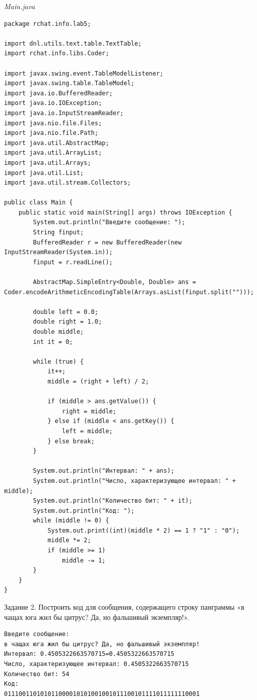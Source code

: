 \documentclass[a4paper,14pt]{extarticle}
\begin{document}
\textit{Main.java}
\begin{verbatim}
package rchat.info.lab5;

import dnl.utils.text.table.TextTable;
import rchat.info.libs.Coder;

import javax.swing.event.TableModelListener;
import javax.swing.table.TableModel;
import java.io.BufferedReader;
import java.io.IOException;
import java.io.InputStreamReader;
import java.nio.file.Files;
import java.nio.file.Path;
import java.util.AbstractMap;
import java.util.ArrayList;
import java.util.Arrays;
import java.util.List;
import java.util.stream.Collectors;

public class Main {
    public static void main(String[] args) throws IOException {
        System.out.println("Введите сообщение: ");
        String finput;
        BufferedReader r = new BufferedReader(new InputStreamReader(System.in));
        finput = r.readLine();

        AbstractMap.SimpleEntry<Double, Double> ans = Coder.encodeArithmeticEncodingTable(Arrays.asList(finput.split("")));

        double left = 0.0;
        double right = 1.0;
        double middle;
        int it = 0;

        while (true) {
            it++;
            middle = (right + left) / 2;

            if (middle > ans.getValue()) {
                right = middle;
            } else if (middle < ans.getKey()) {
                left = middle;
            } else break;
        }

        System.out.println("Интервал: " + ans);
        System.out.println("Число, характеризующее интервал: " + middle);
        System.out.println("Количество бит: " + it);
        System.out.println("Код: ");
        while (middle != 0) {
            System.out.print((int)(middle * 2) == 1 ? "1" : "0");
            middle *= 2;
            if (middle >= 1)
                middle -= 1;
        }
    }
}
\end{verbatim}

Задание 2. Построить код для сообщения, содержащего строку панграммы
«в чащах юга жил бы цитрус? Да, но фальшивый экземпляр!».

\begin{verbatim}
Введите сообщение: 
в чащах юга жил бы цитрус? Да, но фальшивый экземпляр!
Интервал: 0.4505322663570715=0.4505322663570715
Число, характеризующее интервал: 0.4505322663570715
Количество бит: 54
Код: 
011100110101011000010101001001011100101111011111110001
\end{verbatim}
\end{document}
